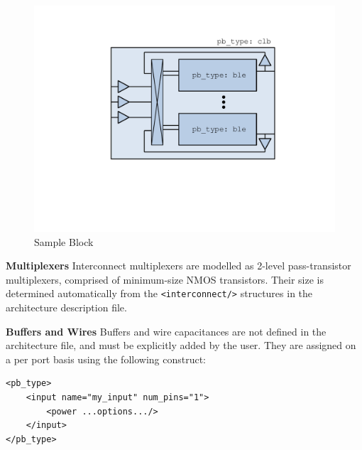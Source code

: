 \documentclass[letterpaper,twoside,10pt]{article}
\begin{document}
\begin{figure}[ht]
	\centering
		\includegraphics[scale=0.5]{images/sample_clb.pdf}
	\caption{Sample Block}
	\label{fig:sample_clb}
\end{figure}


\textbf{Multiplexers} Interconnect multiplexers are modelled as 2-level pass-transistor multiplexers, comprised of minimum-size NMOS transistors. Their size is determined automatically from the \texttt{<interconnect/>} structures in the architecture description file.  

\textbf{Buffers and Wires} Buffers and wire capacitances are not defined in the architecture file, and must be explicitly added by the user.  They are assigned on a per port basis using the following construct:

\begin{BVerbatim}[bgcolor=LightGray, boxwidth=\textwidth] 
<pb_type>
	<input name="my_input" num_pins="1">
		<power ...options.../>
	</input>
</pb_type>
\end{BVerbatim}
\end{document}
